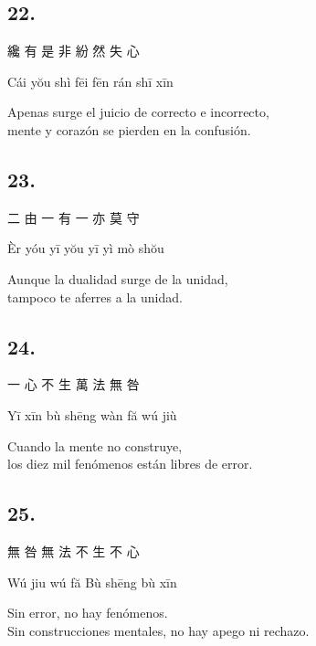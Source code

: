 \documentclass[
  a5paperpaper,
]{article}
\begin{document}
\begin{verseblock}

\hypertarget{section-96}{%
\subsection{22.}\label{section-96}}

纔 有 是 非 紛 然 失 心

Cái yŏu shì fēi fēn rán shī xīn

Apenas surge el juicio de correcto e incorrecto,\\
mente y corazón se pierden en la confusión.

\end{verseblock}

\begin{verseblock}

\hypertarget{section-97}{%
\subsection{23.}\label{section-97}}

二 由 一 有 一 亦 莫 守

Èr yóu yī yŏu yī yì mò shŏu

Aunque la dualidad surge de la unidad,\\
tampoco te aferres a la unidad.

\end{verseblock}

\begin{verseblock}

\hypertarget{section-98}{%
\subsection{24.}\label{section-98}}

一 心 不 生 萬 法 無 咎

Yī xīn bù shēng wàn fă wú jiù

Cuando la mente no construye,\\
los diez mil fenómenos están libres de error.

\end{verseblock}

\begin{verseblock}

\hypertarget{section-99}{%
\subsection{25.}\label{section-99}}

無 咎 無 法 不 生 不 心

Wú jiu wú fă Bù shēng bù xīn

Sin error, no hay fenómenos.\\
Sin construcciones mentales, no hay apego ni rechazo.

\end{verseblock}
\end{document}
